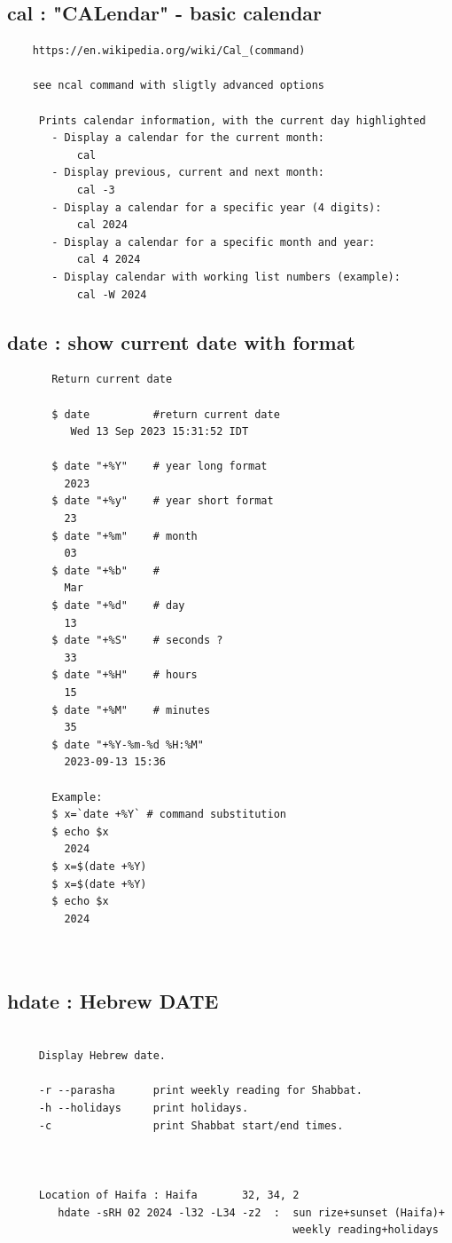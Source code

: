 \documentclass[a4paper,12pt]{article}
\begin{document}
\subsection{cal       : "CALendar" - basic calendar}
\begin{verbatim}
    https://en.wikipedia.org/wiki/Cal_(command)
    
    see ncal command with sligtly advanced options    
     
     Prints calendar information, with the current day highlighted
       - Display a calendar for the current month:
           cal
       - Display previous, current and next month:
           cal -3
       - Display a calendar for a specific year (4 digits):
           cal 2024
       - Display a calendar for a specific month and year:
           cal 4 2024
       - Display calendar with working list numbers (example):
           cal -W 2024
\end{verbatim}

\subsection{date       : show current date with format}
\begin{verbatim}
       Return current date
       
       $ date          #return current date
          Wed 13 Sep 2023 15:31:52 IDT

       $ date "+%Y"    # year long format
         2023
       $ date "+%y"    # year short format   
         23
       $ date "+%m"    # month
         03
       $ date "+%b"    # 
         Mar  
       $ date "+%d"    # day
         13
       $ date "+%S"    # seconds ?
         33
       $ date "+%H"    # hours
         15
       $ date "+%M"    # minutes
         35
       ﻿$ date "+%Y-%m-%d %H:%M"
         2023-09-13 15:36
       
       Example:
       $ x=`date +%Y` # command substitution
       $ echo $x
         2024
       $ x=$(date +%Y)
       $ x=$(date +%Y)
       $ echo $x
         2024

       
\end{verbatim}



\subsection{hdate    : Hebrew DATE}
\begin{verbatim}
     
     Display Hebrew date.
     
     -r --parasha      print weekly reading for Shabbat.
     -h --holidays     print holidays.
     -c                print Shabbat start/end times.

     
     
     Location of Haifa : Haifa       32, 34, 2
        hdate -sRH 02 2024 -l32 -L34 -z2  :  sun rize+sunset (Haifa)+ 
                                             weekly reading+holidays
\end{verbatim}
\end{document}
